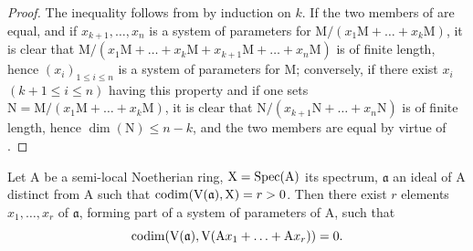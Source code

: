 \begin{proof}
The inequality  follows from  by induction on $k$.
If the two members of  are equal, and if $x_{k+1},\ldots,x_n$ is a system of parameters for $\mathrm{M}/(x_1\mathrm{M}+\ldots+x_k\mathrm{M})$, it is clear that $\mathrm{M}/(x_1\mathrm{M}+\ldots+x_k\mathrm{M}+x_{k+1}\mathrm{M}+\ldots+x_n\mathrm{M})$ is of finite length, hence $(x_i)_{1\leq i\leq n}$ is a system of parameters for $\mathrm{M}$; conversely, if there exist $x_i$ $(k+1\leq i\leq n)$ having this property and if one sets $\mathrm{N}=\mathrm{M}/(x_1\mathrm{M}+\ldots+x_k\mathrm{M})$, it is clear that $\mathrm{N}/(x_{k+1}\mathrm{N}+\ldots+x_n\mathrm{N})$ is of finite length, hence $\dim(\mathrm{N})\leq n-k$, and the two members are equal by virtue of .
\end{proof}


\begin{proposition}[16.3.8]
\label{0.16.3.8}
Let $\mathrm{A}$ be a semi-local Noetherian ring, $\mathrm{X}=\operatorname{Spec}(\mathrm{A})$ its spectrum, $\mathfrak{a}$ an ideal of $\mathrm{A}$ distinct from $\mathrm{A}$ such that $\operatorname{codim}(\mathrm{V}(\mathfrak{a}),\mathrm{X})=r>0$.
Then there exist $r$ elements $x_1,\ldots,x_r$ of $\mathfrak{a}$, forming part of a system of parameters of $\mathrm{A}$, such that
\[
  \operatorname{codim}(\mathrm{V}(\mathfrak{a}),\mathrm{V}(\mathrm{A}x_1+\ldots+\mathrm{A}x_r))=0.
\]
\end{proposition}

